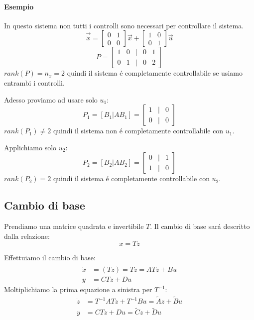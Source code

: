 \documentclass[../main.tex]{subfiles}
\begin{document}
		\begin{mdframed}[style=Esempio]
			\paragraph{Esempio}
			In questo sistema non tutti i controlli sono necessari per controllare il sistema.
			\[
				\vec{\dot x} =
				\begin{bmatrix}
					0 & 1\\
					0 & 0
				\end{bmatrix} \vec x +
				\begin{bmatrix}
				1 & 0\\
				0 & 1
				\end{bmatrix} \vec u 
			\]
			\[
				P =
				\begin{bmatrix}
					1 & 0 & | & 0 & 1\\
					0 & 1 & | & 0 & 2
				\end{bmatrix}
			\]
			$ rank\left( P \right) = n_x = 2 $ quindi il sistema \'e completamente controllabile se usiamo entrambi i controlli.
			
			Adesso proviamo ad usare solo $ u_1 $:
			\[
				P_1  = \left[ B_1 | AB_1 \right] =
				\begin{bmatrix}
					1 & | & 0\\
					0 & | & 0
				\end{bmatrix}
			\]
			$ rank\left( P_1 \right) \neq 2 $ quindi il sistema non \'e completamente controllabile con $ u_1 $.
			
			Applichiamo solo $ u_2 $:
			\[
			P_2  = \left[ B_2 | AB_2 \right] =
				\begin{bmatrix}
					0 & | & 1\\
					1 & | & 0
				\end{bmatrix}
			\]
			$ rank\left( P_2 \right) = 2 $ quindi il sistema \'e completamente controllabile con $ u_2 $.
		\end{mdframed}
		
	\subsection{Cambio di base}
		Prendiamo una matrice quadrata e invertibile $ T $. Il cambio di base sar\'a descritto dalla relazione:
		\[ 
			x = Tz
		\]
		
		Effettuiamo il cambio di base:
		\begin{align*}
			\dot x &= \dot{(Tz)} = T \dot z = ATz + Bu
			\\
			y &= CTz + Du
		\end{align*}
		Moltiplichiamo la prima equazione a sinistra per $ T^{-1} $:
		\begin{align}
			\dot z &= T^{-1}ATz + T^{-1}Bu = \tilde A z + \tilde B u
			\\
			y &= CTz + Du = \tilde C z + \tilde D u
		\end{align}
		
\end{document}
